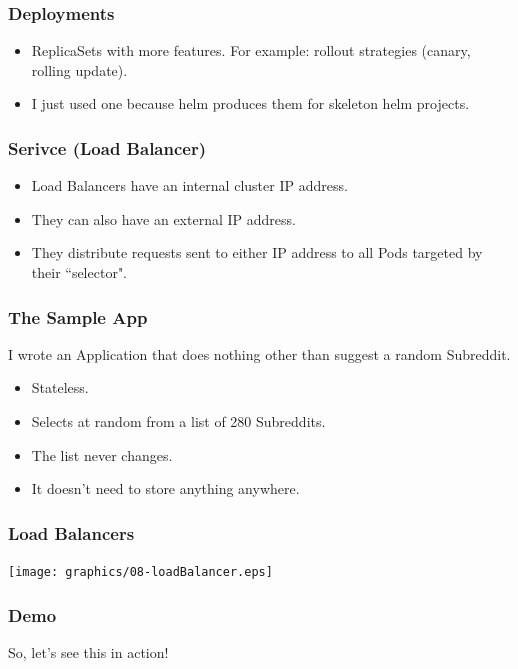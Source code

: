    \begin{frame}
        \frametitle{Deployments}
        \begin{itemize}
            \item ReplicaSets with more features. For example: rollout strategies (canary, rolling update).\pause
            \item I just used one because helm produces them for skeleton helm projects.
        \end{itemize}
    \end{frame}

    \begin{frame}
        \frametitle{Serivce (Load Balancer)}
        \begin{itemize}
            \item Load Balancers have an internal cluster IP address.\pause
            \item They can also have an external IP address.\pause
            \item They distribute requests sent to either IP address to all Pods targeted by their ``selector".
        \end{itemize}
    \end{frame}

    \begin{frame}
        \frametitle{The Sample App}
        I wrote an Application that does nothing other than suggest a random Subreddit.\pause
        \begin{itemize}
            \item Stateless.\pause
            \item Selects at random from a list of 280 Subreddits.\pause
            \item The list never changes.\pause
            \item It doesn't need to store anything anywhere.
        \end{itemize}
    \end{frame}

    \begin{frame}
        \frametitle{Load Balancers}
        \texttt{[image: graphics/08-loadBalancer.eps]}
    \end{frame}

    \begin{frame}
        \frametitle{Demo}
        \begin{center}
            \Huge So, let's see this in action!
        \end{center}
    \end{frame}

